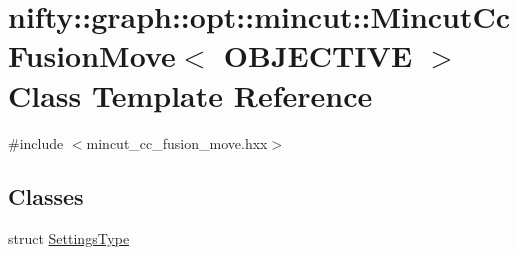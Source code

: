 \hypertarget{classnifty_1_1graph_1_1opt_1_1mincut_1_1MincutCcFusionMove}{}\section{nifty\+:\+:graph\+:\+:opt\+:\+:mincut\+:\+:Mincut\+Cc\+Fusion\+Move$<$ O\+B\+J\+E\+C\+T\+I\+VE $>$ Class Template Reference}
\label{classnifty_1_1graph_1_1opt_1_1mincut_1_1MincutCcFusionMove}


{\ttfamily \#include $<$mincut\+\_\+cc\+\_\+fusion\+\_\+move.\+hxx$>$}

\subsection*{Classes}
\begin{DoxyCompactItemize}
\item 
struct \hyperlink{structnifty_1_1graph_1_1opt_1_1mincut_1_1MincutCcFusionMove_1_1SettingsType}{Settings\+Type}
\end{DoxyCompactItemize}
